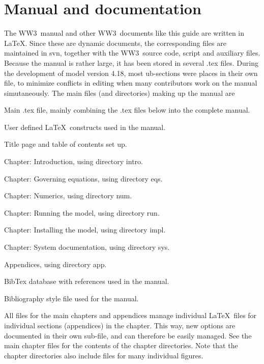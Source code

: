 \documentclass[12pt]{article}
\newcommand{\ws}{WW3}
\newcommand{\file}{\sf}
\newcommand{\pb}{\strut \vfill \pagebreak}
\newcommand{\newsec}{\setcounter{equation}{0}
                      \setcounter{myfigno}{0}
                      \setcounter{mytabno}{0}}
\newenvironment{flist}{\begin{list}{nofile ?}{\parsep 0mm
            \itemsep 0mm \leftmargin 35mm \labelwidth 25mm
            \rightmargin 10mm}}{\end{list}}
\newcommand{\fit}[2]{\item[{\file{#1}}\hfill]{#2}}
\newcounter{myfigno}[section]
\newcounter{mytabno}[section]
\begin{document}
\clearpage

\section{Manual and documentation} \label{sec:man}
\newsec

The \ws\ manual and other \ws\ documents like this guide are written in
\LaTeX. Since these are dynamic documents, the corresponding files are
maintained in svn, together with the \ws\ source code, script and auxiliary
files. Because the manual is rather large, it has been stored in several
{\file .tex} files. During the development of model version 4.18, most
ub-sections were places in their own file, to minimize conflicts in editing
when many contributors work on the manual simutaneously.  The main files (and
directories) making up the manual are

\begin{flist}
\fit{manual.tex}{Main {\file .tex} file, mainly combining the {\file .tex}
                 files below into the complete manual.}
\fit{defs.tex  }{User defined \LaTeX\ constructs used in the manual.}
\fit{start.tex }{Title page and table of contents set up.}
\fit{intro.tex }{Chapter: Introduction, using directory {\file intro}.}
\fit{eqs.tex   }{Chapter: Governing equations, using directory {\file eqs}.}
\fit{num.tex   }{Chapter: Numerics, using directory {\file num}.}
\fit{run.tex   }{Chapter: Running the model, using directory {\file run}.}
\fit{impl.tex  }{Chapter: Installing the model, using directory {\file impl}.}
\fit{sys.tex   }{Chapter: System documentation, using directory {\file sys}.}
\fit{app.tex   }{Appendices, using directory {\file app}.}
\fit{manual.bib}{BibTex database with references used in the manual.}
\fit{jas.bst   }{Bibliography style file used for the manual.}
\end{flist}

\vspace{\baselineskip} \noindent All files for the main chapters and
appendices manage individual \LaTeX\ files for individual sections
(appendices) in the chapter. This way, new options are documented in their own
sub-file, and can therefore be easily managed. See the main chapter files for
the contents of the chapter directories. Note that the chapter directories
also include files for many individual figures.
\end{document}
